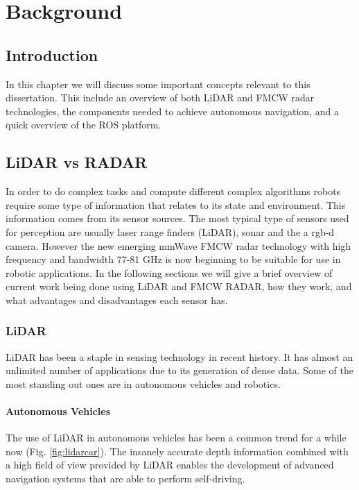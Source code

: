 \chapter{Background} \label{ch:Concepts}

\section{Introduction}
In this chapter we will discuss some important concepts relevant to this dissertation. This include an overview of both \ac{LiDAR} and \ac{FMCW} radar technologies, the components needed to achieve autonomous navigation,  and a quick overview of the \ac{ROS} platform.

\section{\ac{LiDAR} vs \ac{RADAR}}

In order to do complex tasks and compute different complex algorithms robots require some type of information that relates to its state and environment. This information comes from its sensor sources.
The most typical type of sensors used for perception are usually laser range finders (\ac{LiDAR}), sonar and the a rgb-d camera. However the new emerging \ac{mmWave} \ac{FMCW} radar technology with high frequency and bandwidth 77-81 GHz is now beginning to be suitable for use in robotic applications. In the following  sections we will give a brief overview of current work being done using \ac{LiDAR} and \ac{FMCW} \ac{RADAR}, how they work, and what advantages and disadvantages each sensor has.

\subsection{LiDAR}
\ac{LiDAR} has been a staple in sensing technology in recent history. It has almost an  unlimited  number of applications \cite{lidar100uses} due to its generation of dense data. Some of the most standing out ones are in autonomous vehicles and robotics. 
\subsubsection*{Autonomous Vehicles}

The use of \ac{LiDAR} in autonomous vehicles has been a common trend for a while now (Fig. \ref{fig:lidarcar}). The insanely accurate depth information combined with a high field of view provided by \ac{LiDAR} enables the development of advanced navigation systems that are able to perform self-driving.
 
